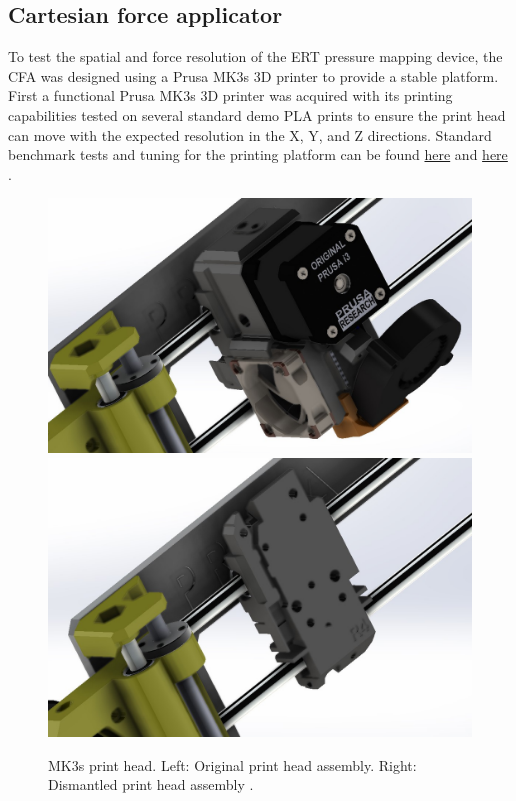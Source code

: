 \subsection{Cartesian force applicator}
To test the spatial and force resolution of the ERT pressure mapping device, the CFA was designed using a Prusa MK3s 3D printer to provide a stable platform. First a functional Prusa MK3s 3D printer was acquired with its printing capabilities tested on several standard demo PLA prints to ensure the print head can move with the expected resolution in the X, Y, and Z directions. Standard benchmark tests and tuning for the printing platform can be found  \href{https://blog.prusa3d.com/does-your-freshly-assembled-original-prusa-i3-mk3-print-as-the-best-it-can_29445/}{here} and \href{https://help.prusa3d.com/category/print-quality-troubleshooting_225}{here} \cite{Stritesky2019, Prusa2024}.

\begin{figure}[H]
\centering
\includegraphics[width=0.4\linewidth]{Figures/og_MK3s_print_head.jpg}
\hspace{1cm}
\includegraphics[width=0.4\linewidth]{Figures/dismantled_MK3s_print_head.jpg}
\caption{MK3s print head. Left: Original print head assembly. Right: Dismantled print head assembly \cite{Kayne2019}.}
\label{fig:mk3s_head_old_raw}
\end{figure}

